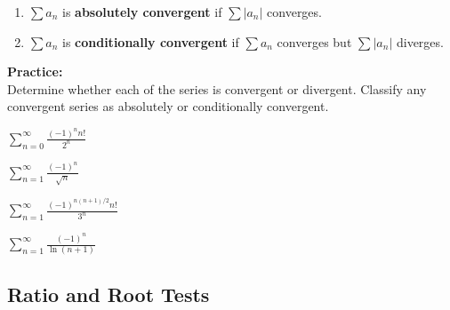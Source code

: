 \documentclass[addpoints, 12pt]{exam}
\begin{document}
\begin{tcolorbox}[title= DEFINITIONS OF ABSOLUTE AND CONDITIONAL CONVERGENCE,colframe=black,sharp corners,colback=white,colbacktitle=white,coltitle=black]

    \begin{enumerate}
        \item $\displaystyle\sum a_n$ is \textbf{absolutely convergent} if $\displaystyle\sum\left|a_n\right|$ converges.
        \item $\displaystyle\sum a_n$ is \textbf{conditionally convergent} if $\displaystyle\sum a_n$ converges but $\displaystyle\sum\left|a_n\right|$ diverges.
    \end{enumerate}

\end{tcolorbox}
\vspace{.1in}
\noindent\textbf{Practice:}\\
Determine whether each of the series is convergent or divergent. Classify any convergent series as absolutely or conditionally convergent.
\begin{questions}
    
    \begin{minipage}{0.45\linewidth}
    \question $\displaystyle\sum_{n=0}^\infty \frac{(-1)^n n!}{2^n}$
    \end{minipage}
    \hfill
    \begin{minipage}{0.45\linewidth}
    \question $\displaystyle\sum_{n=1}^\infty \frac{(-1)^n}{\sqrt{n}}$
    \end{minipage}
    
    \begin{minipage}{0.45\linewidth}
    \question $\displaystyle\sum_{n=1}^\infty \frac{(-1)^{n(n+1)/2} n!}{3^n}$
    \end{minipage}
    \hfill
    \begin{minipage}{0.45\linewidth}
    \question $\displaystyle\sum_{n=1}^\infty \frac{(-1)^n}{\ln(n+1)}$
    \end{minipage}
    
    
\end{questions}


\newpage
{}
\subsection*{Ratio and Root Tests}
\end{document}
